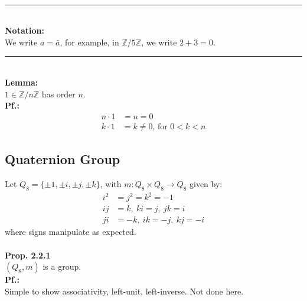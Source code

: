 \documentclass{article}
\begin{document}
\vspace{2mm}~\\
\hrule
\vspace{2mm}~\\
\textbf{Notation:}\\
We write $a=\bar{a}$, for example, in $\mathbb{Z}/5\mathbb{Z}$, we write $2+3=0$.
\vspace{2mm}~\\
\hrule
\vspace{2mm}~\\
\textbf{Lemma:}\\
$1\in\mathbb{Z}/n\mathbb{Z}$ has order $n$.\\
\textbf{Pf.:}\\
\begin{align*}
n\cdot 1 &= n = 0\\
k\cdot 1&=k\neq 0 \text{, for } 0<k<n
\end{align*}
\subsection{Quaternion Group}
Let $Q_8=\lbrace \pm 1,\pm i,\pm j,\pm k \rbrace$, with $m:Q_8\times Q_8\rightarrow Q_8$ given by:
\begin{align*}
i^2&=j^2=k^2=-1\\
ij&=k,~ki=j,~jk=i\\
ji&=-k,~ik=-j,~kj=-i
\end{align*}
where signs manipulate as expected.\\
\vspace{2mm}~\\
\textbf{Prop. 2.2.1}\\
$(Q_8,m)$ is a group.
\vspace{2mm}~\\
\textbf{Pf.:}\\
Simple to show associativity, left-unit, left-inverse. Not done here.\\
\newpage
\end{document}
